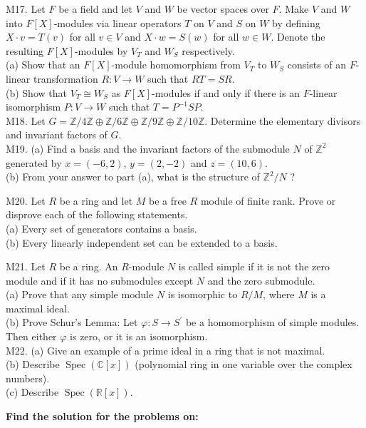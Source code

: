 M17. Let $F$ be a field and let $V$ and $W$ be vector spaces over $F$. Make $V$ and $W$ into $F[X]$-modules via linear operators $T$ on $V$ and $S$ on $W$ by defining $X \cdot v=T(v)$ for all $v \in V$ and $X \cdot w=S(w)$ for all $w \in W$. Denote the resulting $F[X]$-modules by $V_{T}$ and $W_{S}$ respectively.\\
(a) Show that an $F[X]$-module homomorphism from $V_{T}$ to $W_{S}$ consists of an $F$-linear transformation $R: V \rightarrow W$ such that $R T=S R$.\\
(b) Show that $V_{T} \cong W_{S}$ as $F[X]$-modules if and only if there is an $F$-linear isomorphism $P: V \rightarrow W$ such that $T=P^{-1} S P$.\\
M18. Let $G=\mathbb{Z} / 4 \mathbb{Z} \oplus \mathbb{Z} / 6 \mathbb{Z} \oplus \mathbb{Z} / 9 \mathbb{Z} \oplus \mathbb{Z} / 10 \mathbb{Z}$. Determine the elementary divisors and invariant factors of $G$.\\
M19. (a) Find a basis and the invariant factors of the submodule $N$ of $\mathbb{Z}^{2}$ generated by $x=(-6,2)$, $y=(2,-2)$ and $z=(10,6)$.\\
(b) From your answer to part (a), what is the structure of $\mathbb{Z}^{2} / N$ ?

M20. Let $R$ be a ring and let $M$ be a free $R$ module of finite rank. Prove or disprove each of the following statements.\\
(a) Every set of generators contains a basis.\\
(b) Every linearly independent set can be extended to a basis.

M21. Let $R$ be a ring. An $R$-module $N$ is called simple if it is not the zero module and if it has no submodules except $N$ and the zero submodule.\\
(a) Prove that any simple module $N$ is isomorphic to $R / M$, where $M$ is a maximal ideal.\\
(b) Prove Schur's Lemma: Let $\varphi: S \rightarrow S^{\prime}$ be a homomorphism of simple modules. Then either $\varphi$ is zero, or it is an isomorphism.\\
M22. (a) Give an example of a prime ideal in a ring that is not maximal.\\
(b) Describe $\operatorname{Spec}(\mathbb{C}[x])$ (polynomial ring in one variable over the complex numbers).\\
(c) Describe $\operatorname{Spec}(\mathbb{R}[x])$.

\textbf{Find the solution for the problems on: }